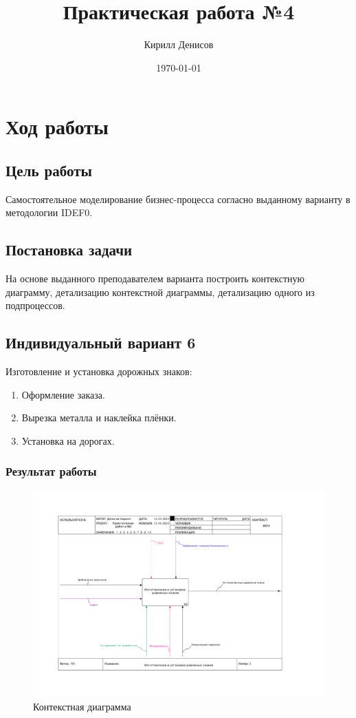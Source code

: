 \documentclass[a4paper,14pt]{extarticle}
\author{Кирилл Денисов}
\title{Практическая работа №4}
\date{\today}
\newcommand{\pathToCommonFolder}{/home/denilai/Documents/repos/latex/Common}
\begin{document}
	\thispagestyle{empty}
	
	\newpage
	\newpage
\section{Ход работы}

\subsection*{Цель работы}
Самостоятельное
моделирование
бизнес-процесса
согласно выданному варианту в методологии IDEF0.

\subsection*{Постановка задачи}
На основе выданного преподавателем варианта
построить контекстную диаграмму, детализацию контекстной диаграммы,
детализацию одного из подпроцессов.

\subsection*{Индивидуальный вариант 6}
	
	Изготовление и установка дорожных знаков:
\begin{enumerate}
	\item 	Оформление заказа.

	\item Вырезка металла и наклейка плёнки.

	\item Установка на дорогах.
\end{enumerate}

\subsubsection*{Результат работы}
\begin{figure}%
	\centering
	\includegraphics[width=0.9\linewidth]{images/ramusPr5-1}
	\caption{Контекстная диаграмма}
	\label{fig:ramuspr5-1}
\end{figure}
\end{document}
